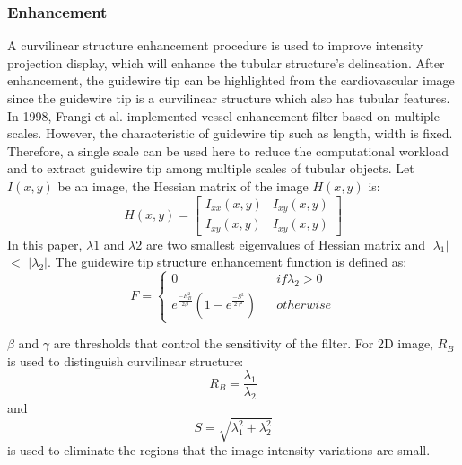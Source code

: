 \documentclass[journal]{IEEEtran}
\begin{document}
\subsubsection{Enhancement} 
A curvilinear structure enhancement procedure is used to improve intensity projection display, which will enhance the tubular structure's delineation. After enhancement, the guidewire tip can be highlighted from the cardiovascular image since the guidewire tip is a curvilinear structure which also has tubular features.
In 1998, Frangi et al. \cite{frangi1998multiscale} implemented vessel enhancement filter based on multiple scales. However, the characteristic of guidewire tip such as length, width is fixed. Therefore, a single scale can be used here to reduce the computational workload and to extract guidewire tip among multiple scales of tubular objects.
Let $I(x,y)$ be an image, the Hessian matrix of the image $H(x,y)$ is:
\begin{equation}
H(x,y)= 
\left[\begin{array}{ccc}
I_{xx}(x,y) & I_{xy}(x,y)\\
I_{xy}(x,y) & I_{xy}(x,y)
\end{array}
\right]
\end{equation}
In this paper, $\lambda1$ and $\lambda2$ are two smallest eigenvalues of Hessian matrix and $|\lambda_1|$ $<$ $|\lambda_2|$. The guidewire tip structure enhancement function is defined as:
\begin{equation}
F=\left\{
\begin{array}{ccc}
0 & &  {if \lambda_2 > 0}\\
e^{\frac{-R^{2}_B}{2 \beta}}(1-e^{\frac{-S^{2}}{2\gamma^{2}}}) & & {otherwise}
\end{array} \right.
\end{equation}

$\beta$ and $\gamma$ are thresholds that control the sensitivity of the filter. For 2D image, $R_B$ is used to distinguish curvilinear structure:
\begin{equation}{
R_B = \frac{\lambda_1}{\lambda_2}}
\end{equation}
and 
\begin{equation}{ 
S = \sqrt{\lambda_1^{2}+ \lambda_2^{2}}}
\end{equation}
is used to eliminate the regions that the image intensity variations are small.
\end{document}

